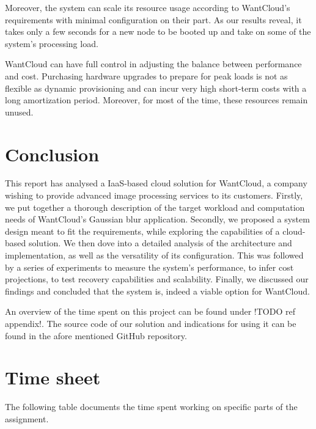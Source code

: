 \documentclass{acm_proc_article-sp}
\begin{document}
Moreover, the system can scale its resource usage according to WantCloud's requirements with minimal configuration on their part. 
As our results reveal, it takes only a few seconds for a new node to be booted up and take on some of the system's processing load. 

WantCloud can have full control in adjusting the balance between performance and cost. 
Purchasing hardware upgrades to prepare for peak loads is not as flexible as dynamic provisioning and can incur very high short-term costs with a long amortization period. Moreover, for most of the time, these resources remain unused. 


\section{Conclusion}
\label{sec:conclusion}
This report has analysed a IaaS-based cloud solution for WantCloud, a company wishing to provide advanced image processing services to its customers.
 Firstly, we put together a thorough description of the target workload and computation needs of WantCloud's Gaussian blur application. 
Secondly, we proposed a system design meant to fit the requirements, while exploring the capabilities of a cloud-based solution.
We then dove into a detailed analysis of the architecture and implementation, as well as the versatility of its configuration.
This was followed by a series of experiments to measure the system's performance, to infer cost projections, to test recovery capabilities and scalability.
Finally, we discussed our findings and concluded that the system is, indeed a viable option for WantCloud.

An overview of the time spent on this project can be found under !TODO ref appendix!. 
The source code of our solution and indications for using it can be found in the afore mentioned GitHub repository\cite{web:git}.

{}


\appendix
\section{Time sheet}

The following table documents the time spent working on specific parts of the assignment.
\end{document}
